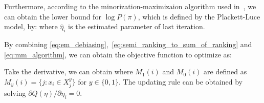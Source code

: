 Furthermore, according to the minorization-maximizaion algorithm used in~\cite{hunter:aos2004}, 
we can obtain the lower bound for $\log P(\pi)$, which is defined by the Plackett-Luce model, by:
%
where $\hat{\eta}_i$ is the estimated parameter of last iteration.  

By combining \eqref{eq:em_debiasing},~\eqref{eq:semi_ranking_to_sum_of_ranking} and \eqref{eq:mm_algorithm}, 
we can obtain the objective function to optimize as:
%

Take the derivative, we can obtain
%
where $M_1(i)$ and $M_0(i)$ are defined as $M_y(i) = \{j:x_i \in X_j^y\}$ for $y \in \{0, 1\}$.  
The updating rule can be obtained by solving $\partial Q(\eta) / \partial \eta_i = 0$.  



